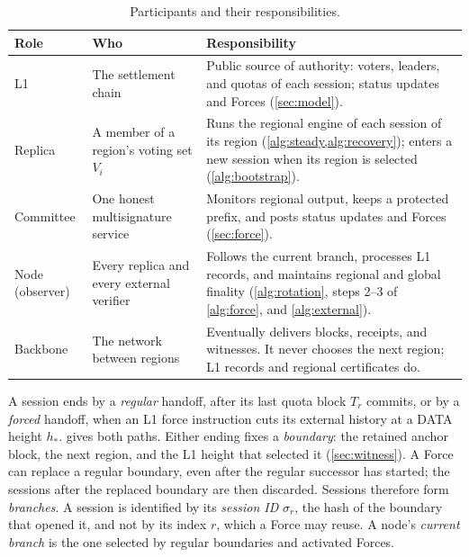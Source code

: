 \documentclass[11pt,a4paper]{article}
\newif\ifrevmarks
\newcommand{\Rv}[1]{\ifrevmarks\leavevmode{\color{rvBlue}#1}\else#1\fi}
\newcommand{\Cid}[1]{\ifrevmarks\textsuperscript{\hyperlink{chg:#1}{\color{rvBlue}\sffamily\scriptsize#1}}\fi}
\begin{document}
\begin{table}[htbp]\centering\small
\caption{\Rv{Participants and their responsibilities.}}
\label{tab:roles}
\begin{tabularx}{\linewidth}{@{}>{\raggedright\arraybackslash}p{.15\linewidth}>{\raggedright\arraybackslash}p{.25\linewidth}Y@{}}
\toprule
\Rv{Role} & \Rv{Who} & \Rv{Responsibility}\\
\midrule
\Rv{L1} & \Rv{The settlement chain} & \Rv{Public source of authority:
voters, leaders, and quotas of each session; status updates and Forces
(\cref{sec:model}).}\\
\Rv{Replica} & \Rv{A member of a region's voting set $V_i$} &
\Rv{Runs the regional engine of each session of its region
(\cref{alg:steady,alg:recovery}); enters a new session when its region
is selected (\cref{alg:bootstrap}).}\\
\Rv{Committee} & \Rv{One honest multisignature service} &
\Rv{Monitors regional output, keeps a protected prefix, and posts status
updates and Forces (\cref{sec:force}).}\\
\Rv{Node (observer)} & \Rv{Every replica and every external verifier} &
\Rv{Follows the current branch, processes L1 records, and maintains
regional and global finality (\cref{alg:rotation}, steps 2--3 of
\cref{alg:force}, and \cref{alg:external}).}\\
\Rv{Backbone} & \Rv{The network between regions} & \Rv{Eventually
delivers blocks, receipts, and witnesses. It never chooses the next
region; L1 records and regional certificates do.}\\
\bottomrule
\end{tabularx}
\end{table}

A session ends by a \emph{regular} handoff, after its last quota block
$T_r$ commits, or by a \emph{forced} handoff, when an L1 force
instruction cuts its external history at a DATA height $h_*$.
 gives both paths. \Rv{Either ending fixes a
\emph{boundary}: the retained anchor block, the next region, and the L1
height that selected it (\cref{sec:witness}). A Force can replace a
regular boundary, even after the regular successor has started; the
sessions after the replaced boundary are then discarded. Sessions
therefore form \emph{branches}. A session is identified by its
\emph{session ID} $\sigma_r$, the hash of the boundary that opened it,
and not by its index $r$, which a Force may reuse. A node's
\emph{current branch} is the one selected by regular boundaries and
activated Forces.}
\end{document}
